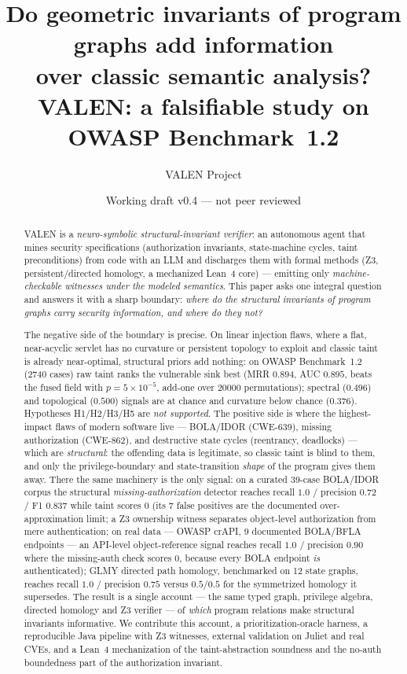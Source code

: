 \documentclass[11pt]{article}
\title{\bfseries Do geometric invariants of program graphs add information\\ over classic semantic analysis?\\[2mm]\Large VALEN: a falsifiable study on OWASP Benchmark~1.2}
\author{VALEN Project}
\date{Working draft v0.4 --- not peer reviewed}
\begin{document}
\maketitle

\begin{abstract}
\noindent VALEN is a \emph{neuro-symbolic structural-invariant verifier}: an
autonomous agent that mines security specifications (authorization invariants,
state-machine cycles, taint preconditions) from code with an LLM and discharges
them with formal methods (Z3, persistent/directed homology, a mechanized Lean~4
core) --- emitting only \emph{machine-checkable witnesses under the modeled
semantics}. This paper asks one integral question and answers it with a sharp
boundary: \emph{where do the structural invariants of program graphs carry
security information, and where do they not?}

The negative side of the boundary is precise. On linear injection flaws, where a
flat, near-acyclic servlet has no curvature or persistent topology to exploit and
classic taint is already near-optimal, structural priors add nothing: on OWASP
Benchmark~1.2 (2740 cases) raw taint ranks the vulnerable sink best (MRR
$0.894$, AUC $0.895$, beats the fused field with $p=5\times10^{-5}$, add-one over
20000 permutations); spectral ($0.496$) and topological ($0.500$) signals are at
chance and curvature below chance ($0.376$). Hypotheses H1/H2/H3/H5 are
\emph{not supported}. The positive side is where the highest-impact flaws of
modern software live --- BOLA/IDOR (CWE-639), missing authorization (CWE-862),
and destructive state cycles (reentrancy, deadlocks) --- which are
\emph{structural}: the offending data is legitimate, so classic taint is blind
to them, and only the privilege-boundary and state-transition \emph{shape} of the
program gives them away. There the same machinery is the only signal: on a
curated 39-case BOLA/IDOR corpus the structural \emph{missing-authorization}
detector reaches recall $1.0$ / precision $0.72$ / F1 $0.837$ while taint scores
$0$ (its $7$ false positives are the documented over-approximation limit; a Z3
ownership witness separates object-level authorization from mere authentication;
on real data --- OWASP crAPI, 9 documented BOLA/BFLA endpoints --- an API-level
object-reference signal reaches recall $1.0$ / precision $0.90$ where the
missing-auth check scores $0$, because every BOLA endpoint \emph{is}
authenticated);
GLMY directed path homology, benchmarked on 12 state graphs, reaches
recall $1.0$ / precision $0.75$ versus $0.5$/$0.5$ for the symmetrized homology
it supersedes. The
result is a single account --- the same typed graph, privilege algebra, directed
homology and Z3 verifier --- of \emph{which} program relations make structural
invariants informative. We contribute this account, a prioritization-oracle
harness, a reproducible Java pipeline with Z3 witnesses, external validation on
Juliet and real CVEs, and a Lean~4 mechanization of the taint-abstraction
soundness and the no-auth boundedness part of the authorization invariant.
\end{abstract}
\end{document}
